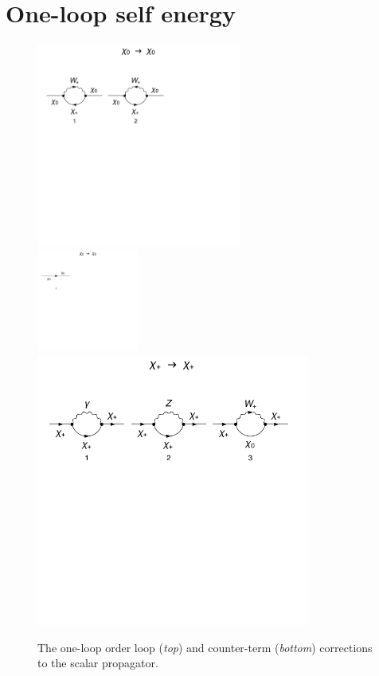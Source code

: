 \documentclass[11pt]{article}
\begin{document}
\section{One-loop self energy}
\begin{figure}[h!]
\center
\includegraphics[width=0.6\textwidth]{1loop.pdf}\\
\includegraphics[width=0.3\textwidth]{1loop_1c.pdf}\\
\includegraphics[width=0.8\textwidth]{diagrams_F[1]_1.pdf}
\caption{The one-loop order loop (\textit{top}) and counter-term (\textit{bottom}) corrections to the scalar propagator.}\label{fig:1loop_chi}
\end{figure}
\end{document}
